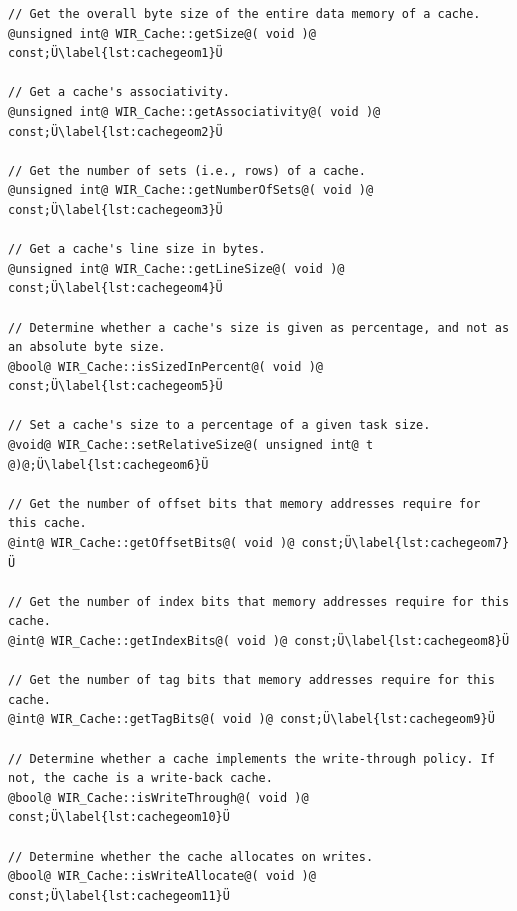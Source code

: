 \begin{lstlisting}[style=code,float=t,caption={Geometry-Related Attributes of Class \texttt{WIR\_Cache}},label=lst:cachegeom]
// Get the overall byte size of the entire data memory of a cache.
@unsigned int@ WIR_Cache::getSize@( void )@ const;Ü\label{lst:cachegeom1}Ü

// Get a cache's associativity.
@unsigned int@ WIR_Cache::getAssociativity@( void )@ const;Ü\label{lst:cachegeom2}Ü

// Get the number of sets (i.e., rows) of a cache.
@unsigned int@ WIR_Cache::getNumberOfSets@( void )@ const;Ü\label{lst:cachegeom3}Ü

// Get a cache's line size in bytes.
@unsigned int@ WIR_Cache::getLineSize@( void )@ const;Ü\label{lst:cachegeom4}Ü

// Determine whether a cache's size is given as percentage, and not as an absolute byte size.
@bool@ WIR_Cache::isSizedInPercent@( void )@ const;Ü\label{lst:cachegeom5}Ü

// Set a cache's size to a percentage of a given task size.
@void@ WIR_Cache::setRelativeSize@( unsigned int@ t @)@;Ü\label{lst:cachegeom6}Ü

// Get the number of offset bits that memory addresses require for this cache.
@int@ WIR_Cache::getOffsetBits@( void )@ const;Ü\label{lst:cachegeom7}Ü

// Get the number of index bits that memory addresses require for this cache.
@int@ WIR_Cache::getIndexBits@( void )@ const;Ü\label{lst:cachegeom8}Ü

// Get the number of tag bits that memory addresses require for this cache.
@int@ WIR_Cache::getTagBits@( void )@ const;Ü\label{lst:cachegeom9}Ü

// Determine whether a cache implements the write-through policy. If not, the cache is a write-back cache.
@bool@ WIR_Cache::isWriteThrough@( void )@ const;Ü\label{lst:cachegeom10}Ü

// Determine whether the cache allocates on writes.
@bool@ WIR_Cache::isWriteAllocate@( void )@ const;Ü\label{lst:cachegeom11}Ü
\end{lstlisting}

